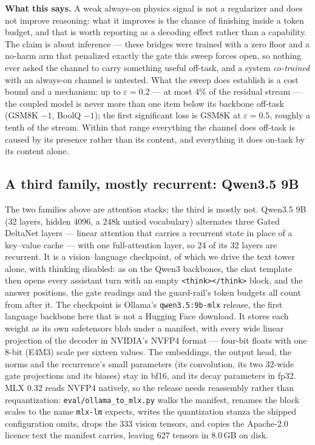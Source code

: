 \documentclass[11pt]{article}
\newcommand{\code}[1]{\texttt{#1}}
\begin{document}
\textbf{What this says.} A weak always-on physics signal is not a regularizer and does not improve reasoning: what it improves is the chance of finishing inside a token budget, and that is worth reporting as a decoding effect rather than a capability. The claim is about inference --- these bridges were trained with a zero floor and a no-harm arm that penalized exactly the gate this sweep forces open, so nothing ever asked the channel to carry something useful off-task, and a system \emph{co-trained} with an always-on channel is untested. What the sweep does establish is a cost bound and a mechanism: up to $\varepsilon = 0.2$ --- at most 4\% of the residual stream --- the coupled model is never more than one item below its backbone off-task (GSM8K $-1$, BoolQ $-1$); the first significant loss is GSM8K at $\varepsilon = 0.5$, roughly a tenth of the stream. Within that range everything the channel does off-task is caused by its presence rather than its content, and everything it does on-task by its content alone.

\subsection{A third family, mostly recurrent: Qwen3.5 9B}
\label{sec:qwen35}

The two families above are attention stacks; the third is mostly not. Qwen3.5 9B \citep{qwen2026qwen35} (32 layers, hidden 4096, a 248k untied vocabulary) alternates three Gated DeltaNet layers \citep{yang2025gateddeltanet} --- linear attention that carries a recurrent state in place of a key--value cache --- with one full-attention layer, so 24 of its 32 layers are recurrent. It is a vision--language checkpoint, of which we drive the text tower alone, with thinking disabled: as on the Qwen3 backbones, the chat template then opens every assistant turn with an empty \code{<think></think>} block, and the answer positions, the gate readings and the guard-rail's token budgets all count from after it. The checkpoint is Ollama's \code{qwen3.5:9b-mlx} release, the first language backbone here that is not a Hugging Face download. It stores each weight as its own safetensors blob under a manifest, with every wide linear projection of the decoder in NVIDIA's NVFP4 format \citep{nvidia2025nvfp4} --- four-bit floats with one 8-bit (E4M3) scale per sixteen values. The embeddings, the output head, the norms and the recurrence's small parameters (its convolution, its two 32-wide gate projections and its biases) stay in bf16, and its decay parameters in fp32. MLX 0.32 reads NVFP4 natively, so the release needs reassembly rather than requantization: \code{eval/ollama\_to\_mlx.py} walks the manifest, renames the block scales to the name \code{mlx-lm} expects, writes the quantization stanza the shipped configuration omits, drops the 333 vision tensors, and copies the Apache-2.0 licence text the manifest carries, leaving 627 tensors in 8.0\,GB on disk.
\end{document}
